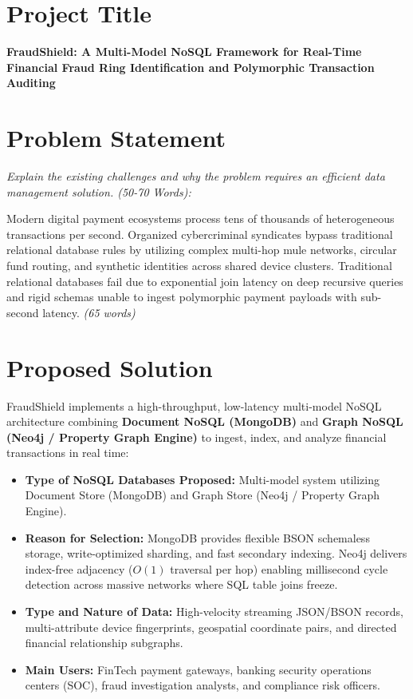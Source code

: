 \documentclass[11pt,a4paper]{article}
\begin{document}
\section{Project Title}
\noindent \textbf{FraudShield: A Multi-Model NoSQL Framework for Real-Time Financial Fraud Ring Identification and Polymorphic Transaction Auditing}

\section{Problem Statement}
\noindent \textit{Explain the existing challenges and why the problem requires an efficient data management solution. (50-70 Words):}

\vspace{0.4em}
\noindent Modern digital payment ecosystems process tens of thousands of heterogeneous transactions per second. Organized cybercriminal syndicates bypass traditional relational database rules by utilizing complex multi-hop mule networks, circular fund routing, and synthetic identities across shared device clusters. Traditional relational databases fail due to exponential join latency on deep recursive queries and rigid schemas unable to ingest polymorphic payment payloads with sub-second latency. \textit{(65 words)}

\section{Proposed Solution}
\noindent FraudShield implements a high-throughput, low-latency multi-model NoSQL architecture combining \textbf{Document NoSQL (MongoDB)} and \textbf{Graph NoSQL (Neo4j / Property Graph Engine)} to ingest, index, and analyze financial transactions in real time:

\begin{itemize}[leftmargin=1.5em]
    \item \textbf{Type of NoSQL Databases Proposed:} Multi-model system utilizing Document Store (MongoDB) and Graph Store (Neo4j / Property Graph Engine).
    \item \textbf{Reason for Selection:} MongoDB provides flexible BSON schemaless storage, write-optimized sharding, and fast secondary indexing. Neo4j delivers index-free adjacency ($O(1)$ traversal per hop) enabling millisecond cycle detection across massive networks where SQL table joins freeze.
    \item \textbf{Type and Nature of Data:} High-velocity streaming JSON/BSON records, multi-attribute device fingerprints, geospatial coordinate pairs, and directed financial relationship subgraphs.
    \item \textbf{Main Users:} FinTech payment gateways, banking security operations centers (SOC), fraud investigation analysts, and compliance risk officers.
\end{itemize}
\end{document}
